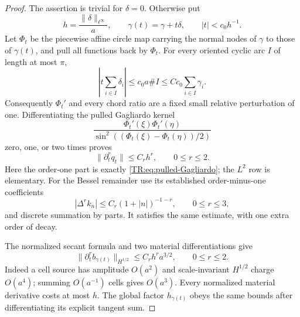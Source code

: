 \documentclass[11pt]{amsart}
\numberwithin{equation}{section}
\theoremstyle{definition}
\theoremstyle{remark}
\begin{document}
\begin{proof}
The assertion is trivial for $\delta=0$.  Otherwise put
\begin{equation}\label{TR:eq:material-h}
 h=\frac{\|\delta\|_{\ell^\infty}}a,
 \qquad \gamma(t)=\gamma+t\delta,
 \qquad |t|<c_0h^{-1}.
\end{equation}
Let $\Phi_t$ be the piecewise affine circle map carrying the normal nodes
of $\gamma$ to those of $\gamma(t)$, and pull all functions back by
$\Phi_t$.  For every oriented cyclic arc $I$ of length at most $\pi$,
\begin{equation}\label{TR:eq:arc-material}
 \left|t\sum_{i\in I}\delta_i\right|
 \le c_0a\# I\le Cc_0\sum_{i\in I}\gamma_i.
\end{equation}
Consequently $\Phi_t'$ and every chord ratio are a fixed small relative
perturbation of one.  Differentiating the pulled Gagliardo kernel
\begin{equation}\label{TR:eq:pulled-Gagliardo}
 \frac{\Phi_t'(\xi)\Phi_t'(\eta)}
 {\sin^2((\Phi_t(\xi)-\Phi_t(\eta))/2)}
\end{equation}
zero, one, or two times proves
\begin{equation}\label{TR:eq:form-material}
 \|\partial_t^rq_t\|\le C_rh^r,\qquad 0\le r\le2.
\end{equation}
Here the order-one part is exactly \eqref{TR:eq:pulled-Gagliardo}; the
$L^2$ row is elementary.  For the Bessel remainder use its established
order-minus-one coefficients
\begin{equation}\label{TR:eq:Bessel-differences}
 |\Delta^rk_n|\le C_r(1+|n|)^{-1-r},\qquad 0\le r\le3,
\end{equation}
and discrete summation by parts.  It satisfies the same estimate, with
one extra order of decay.

The normalized secant formula and two material differentiations give
\begin{equation}\label{TR:eq:source-material}
 \|\partial_t^rb_{\gamma(t)}\|_{H^{1/2}}
 \le C_rh^ra^{3/2},\qquad 0\le r\le2.
\end{equation}
Indeed a cell source has amplitude $O(a^2)$ and scale-invariant
$H^{1/2}$ charge $O(a^4)$; summing $O(a^{-1})$ cells gives $O(a^3)$.
Every normalized material derivative costs at most $h$.  The global
factor $h_{\gamma(t)}$ obeys the same bounds after differentiating its
explicit tangent sum.


\end{proof}
\end{document}
